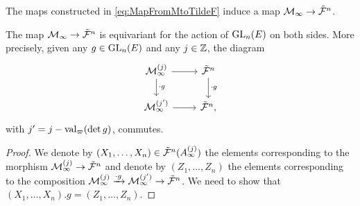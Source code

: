 \documentclass[../main.tex]{subfiles}
\begin{document}
The maps constructed in \eqref{eq:MapFromMtoTildeF} induce a 
map $\mathcal{M}_\infty \to \tilde {\mathcal{F}}^n$.
\begin{lem}\label{lem:EquivarianceForGLn}
    The map $\mathcal{M}_\infty \to \tilde {\mathcal{F}}^n$ is equivariant 
    for the action of $\operatorname{GL}_n(E)$ on both sides. More precisely,
    given any $g \in \operatorname{GL}_n(E)$ and any $j \in \mathbb{Z}$, the diagram
    \begin{equation*}
        \begin{tikzcd}[ampersand replacement=\&]
        	{\cM_\infty^{(j)}} \& {\tilde \cF^n} \\
        	{\cM_\infty^{(j')}} \& {\tilde \cF^n},
        	\arrow[from=1-1, to=1-2]
        	\arrow["{\cdot g}", from=1-1, to=2-1]
        	\arrow["{\cdot g}", from=1-2, to=2-2]
        	\arrow[from=2-1, to=2-2]
        \end{tikzcd}
    \end{equation*}
    with $j' = j - \mathrm{val}_\varpi(\det g)$, commutes.
\begin{proof}
    We denote by $(X_1, \dots, X_n) \in \tilde {\mathcal{F}}^n(A_\infty^{(j)})$
    the elements corresponding to the morphism
    $\mathcal{M}_\infty^{(j)} \to \tilde {\mathcal{F}}^n$ and denote by 
    $(Z_1, \dots, Z_n)$ the elements corresponding to the composition
    $\mathcal{M}_\infty^{(j)} \xrightarrow{\cdot g} \mathcal{M}_\infty^{(j')} \to \tilde {\mathcal{F}}^n$.
    We need to show that $(X_1, \dots, X_n).g = (Z_1, \dots, Z_n)$.


\end{proof}
\end{lem}
\end{document}
